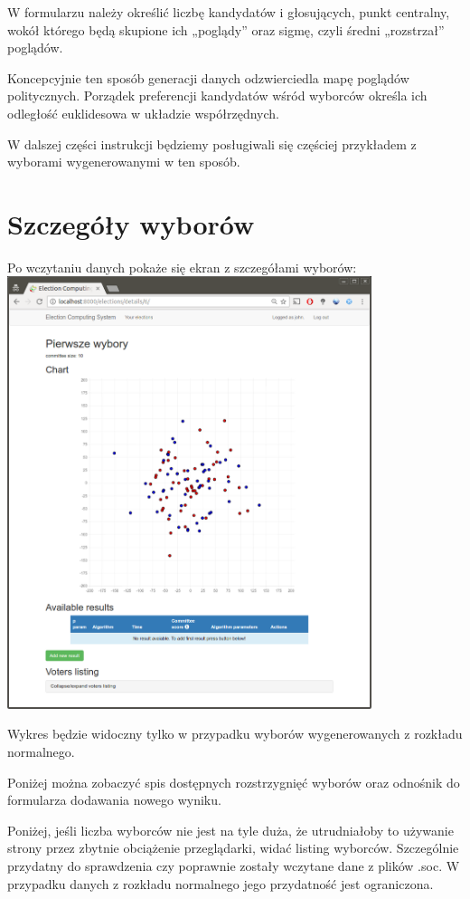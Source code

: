 \documentclass[pdflatex,11pt]{../aghdoc}
\begin{document}
W formularzu należy określić liczbę kandydatów i głosujących, punkt centralny, wokół którego będą skupione ich „poglądy” oraz sigmę, czyli średni „rozstrzał” poglądów.

Koncepcyjnie ten sposób generacji danych odzwierciedla mapę poglądów politycznych. Porządek preferencji kandydatów wśród wyborców określa ich odległość euklidesowa w układzie współrzędnych.

W dalszej części instrukcji będziemy posługiwali się częściej przykładem z wyborami wygenerowanymi w ten sposób.


\section{Szczegóły wyborów}
\label{sec:szczegolywyborow}

Po wczytaniu danych pokaże się ekran z szczegółami wyborów:
\includegraphics[width=0.8\textwidth]{pics/newlycreated.png}

Wykres będzie widoczny tylko w przypadku wyborów wygenerowanych z rozkładu normalnego.

Poniżej można zobaczyć spis dostępnych rozstrzygnięć wyborów oraz odnośnik do formularza dodawania nowego wyniku.

Poniżej, jeśli liczba wyborców nie jest na tyle duża, że utrudniałoby to używanie strony przez zbytnie obciążenie przeglądarki, widać listing wyborców. Szczególnie przydatny do sprawdzenia czy poprawnie zostały wczytane dane z plików .soc. W przypadku danych z rozkładu normalnego jego przydatność jest ograniczona.
\end{document}
